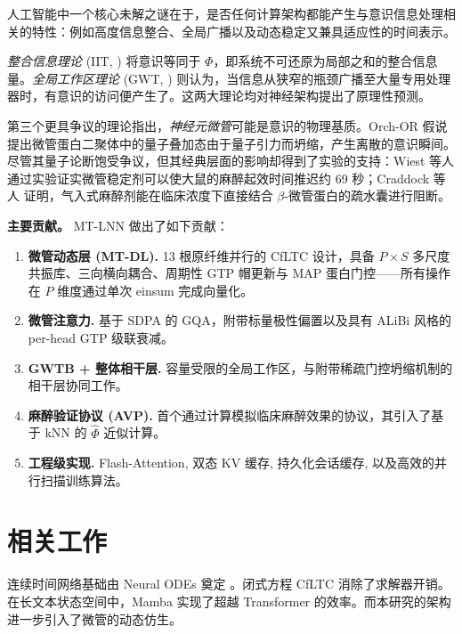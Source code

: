 \documentclass[11pt]{article}
\theoremstyle{definition}
\newcommand{\phihat}{\hat{\Phi}}
\begin{document}
人工智能中一个核心未解之谜在于，是否任何计算架构都能产生与意识信息处理相关的特性：例如高度信息整合、全局广播以及动态稳定又兼具适应性的时间表示。

\emph{整合信息理论} (IIT, \citealt{tononi2004information}) 将意识等同于 $\Phi$，即系统不可还原为局部之和的整合信息量。\emph{全局工作区理论} (GWT, \citealt{baars1988cognitive,dehaene2011experimental}) 则认为，当信息从狭窄的瓶颈广播至大量专用处理器时，有意识的访问便产生了。这两大理论均对神经架构提出了原理性预测。

第三个更具争议的理论指出，\emph{神经元微管}可能是意识的物理基质。Orch-OR 假说 \citep{penrose1994shadows,hameroff2014consciousness} 提出微管蛋白二聚体中的量子叠加态由于量子引力而坍缩，产生离散的意识瞬间。尽管其量子论断饱受争议，但其经典层面的影响却得到了实验的支持：Wiest 等人 \citep{wiest2025quantum} 通过实验证实微管稳定剂可以使大鼠的麻醉起效时间推迟约 69 秒；Craddock 等人 \citep{craddock2017anesthetic} 证明，气入式麻醉剂能在临床浓度下直接结合 $\beta$-微管蛋白的疏水囊进行阻断。

\medskip\noindent\textbf{主要贡献。} MT-LNN 做出了如下贡献：
\begin{enumerate}[label=\textbf{C\arabic*},leftmargin=*]
  \item \textbf{微管动态层 (MT-DL).} 13 根原纤维并行的 CfLTC 设计，具备 $P\!\times\!S$ 多尺度共振库、三向横向耦合、周期性 GTP 帽更新与 MAP 蛋白门控——所有操作在 $P$ 维度通过单次 einsum 完成向量化。
  \item \textbf{微管注意力.} 基于 SDPA 的 GQA，附带标量极性偏置以及具有 ALiBi 风格的 per-head GTP 级联衰减。
  \item \textbf{GWTB + 整体相干层.} 容量受限的全局工作区，与附带稀疏门控坍缩机制的相干层协同工作。
  \item \textbf{麻醉验证协议 (AVP).} 首个通过计算模拟临床麻醉效果的协议，其引入了基于 kNN 的 $\phihat$ 近似计算。
  \item \textbf{工程级实现.} Flash-Attention, 双态 KV 缓存, 持久化会话缓存, 以及高效的并行扫描训练算法。
\end{enumerate}

\section{相关工作}
\label{sec:related}

连续时间网络基础由 Neural ODEs 奠定 \citep{chen2018neural}。闭式方程 CfLTC \citep{hasani2022closed} 消除了求解器开销。在长文本状态空间中，Mamba \citep{gu2023mamba} 实现了超越 Transformer 的效率。而本研究的架构进一步引入了微管的动态仿生。
\end{document}
